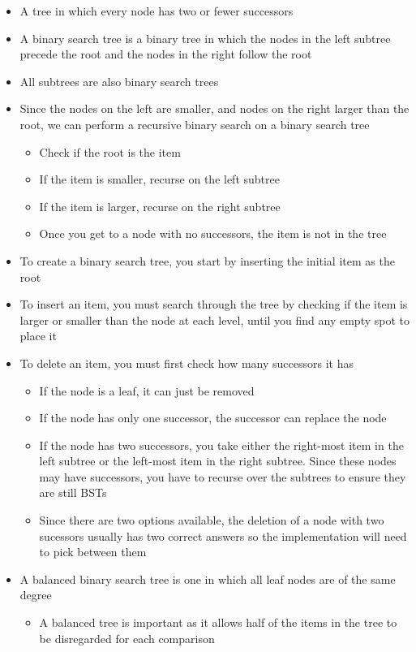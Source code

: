 \begin{itemize}
  \item A tree in which every node has two or fewer successors
  \item A binary search tree is a binary tree in which the nodes in the left subtree precede the root and the nodes in the right follow the root
  \item All subtrees are also binary search trees
  \item Since the nodes on the left are smaller, and nodes on the right larger than the root, we can perform a recursive binary search on a binary search tree
  \begin{itemize}
    \item Check if the root is the item
    \item If the item is smaller, recurse on the left subtree
    \item If the item is larger, recurse on the right subtree
    \item Once you get to a node with no successors, the item is not in the tree
  \end{itemize}
  \item To create a binary search tree, you start by inserting the initial item as the root
  \item To insert an item, you must search through the tree by checking if the item is larger or smaller than the node at each level, until you find any empty spot to place it
  \item To delete an item, you must first check how many successors it has
  \begin{itemize}
    \item If the node is a leaf, it can just be removed
    \item If the node has only one successor, the successor can replace the node
    \item If the node has two successors, you take either the right-most item in the left subtree or the left-most item in the right subtree. Since these nodes may have successors, you have to recurse over the subtrees to ensure they are still BSTs
    \item Since there are two options available, the deletion of a node with two sucessors usually has two correct answers so the implementation will need to pick between them
  \end{itemize}
  \item A balanced binary search tree is one in which all leaf nodes are of the same degree
  \begin{itemize}
    \item A balanced tree is important as it allows half of the items in the tree to be disregarded for each comparison
  \end{itemize}
\end{itemize}

